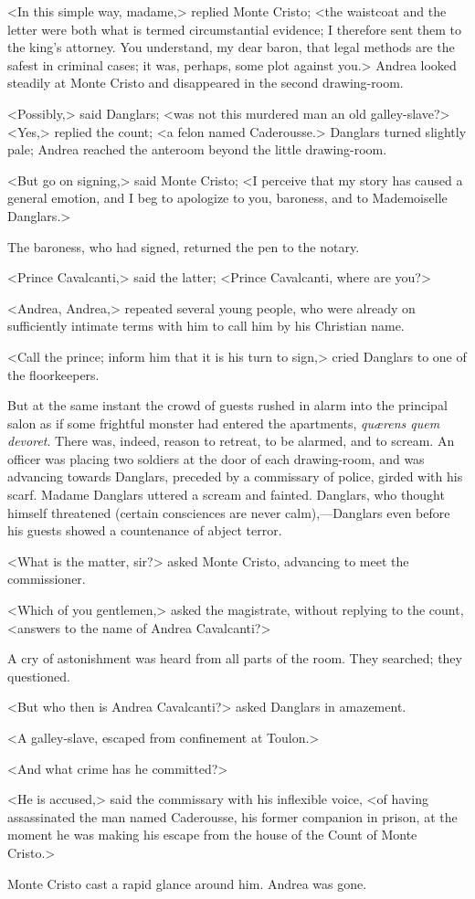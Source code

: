  <In this simple way, madame,> replied Monte Cristo; <the waistcoat and the letter were both what is termed circumstantial evidence; I therefore sent them to the king's attorney. You understand, my dear baron, that legal methods are the safest in criminal cases; it was, perhaps, some plot against you.> Andrea looked steadily at Monte Cristo and disappeared in the second drawing-room. 

 <Possibly,> said Danglars; <was not this murdered man an old galley-slave?>  <Yes,> replied the count; <a felon named Caderousse.> Danglars turned slightly pale; Andrea reached the anteroom beyond the little drawing-room. 

 <But go on signing,> said Monte Cristo; <I perceive that my story has caused a general emotion, and I beg to apologize to you, baroness, and to Mademoiselle Danglars.> 

 The baroness, who had signed, returned the pen to the notary. 

 <Prince Cavalcanti,> said the latter; <Prince Cavalcanti, where are you?> 

 <Andrea, Andrea,> repeated several young people, who were already on sufficiently intimate terms with him to call him by his Christian name. 

 <Call the prince; inform him that it is his turn to sign,> cried Danglars to one of the floorkeepers. 

 But at the same instant the crowd of guests rushed in alarm into the principal salon as if some frightful monster had entered the apartments, \textit{quærens quem devoret}. There was, indeed, reason to retreat, to be alarmed, and to scream. An officer was placing two soldiers at the door of each drawing-room, and was advancing towards Danglars, preceded by a commissary of police, girded with his scarf. Madame Danglars uttered a scream and fainted. Danglars, who thought himself threatened (certain consciences are never calm),—Danglars even before his guests showed a countenance of abject terror. 

 <What is the matter, sir?> asked Monte Cristo, advancing to meet the commissioner. 

 <Which of you gentlemen,> asked the magistrate, without replying to the count, <answers to the name of Andrea Cavalcanti?> 

 A cry of astonishment was heard from all parts of the room. They searched; they questioned. 

 <But who then is Andrea Cavalcanti?> asked Danglars in amazement. 

 <A galley-slave, escaped from confinement at Toulon.> 

 <And what crime has he committed?> 

 <He is accused,> said the commissary with his inflexible voice, <of having assassinated the man named Caderousse, his former companion in prison, at the moment he was making his escape from the house of the Count of Monte Cristo.> 

 Monte Cristo cast a rapid glance around him. Andrea was gone. 